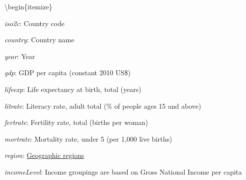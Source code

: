 \documentclass[
]{article}
\begin{document}
\textbackslash begin\{itemize\}

\item

\emph{iso2c}: Country code

\item

\emph{country}: Country name

\item

\emph{year}: Year

\item

\emph{gdp}: GDP per capita (constant 2010 US\$)

\item

\emph{lifeexp}: Life expectancy at birth, total (years)

\item

\emph{litrate}: Literacy rate, adult total (\% of people ages 15 and above)

\item

\emph{fertrate}: Fertility rate, total (births per woman)

\item

\emph{mortrate}: Mortality rate, under 5 (per 1,000 live births)

\item

\emph{region}: \href{https://datahelpdesk.worldbank.org/knowledgebase/articles/378834-how-does-the-world-bank-classify-countries}{Geographic regions}

\item

\emph{incomeLevel}: Income groupings are based on Gross National Income per capita
\end{document}
